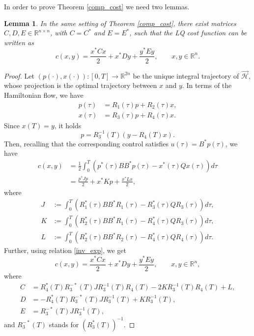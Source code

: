 \documentclass[reqno]{amsart}
\theoremstyle{plain}
\newtheorem{lem}[thm]{Lemma}
\theoremstyle{definition}
\theoremstyle{remark}
\newcommand{\R}{\mathbb{R}}
\begin{document}
In order to prove Theorem \ref{comp_cost} we need two lemmas.
	\begin{lem}\label{lem1}
		In the same setting of Theorem \ref{comp_cost}, there exist matrices $C,D,E\in\mathbb{R}^{n\times n}$, with $C=C^*$ and $E=E^*$, such that the LQ cost function can be written as
		\begin{equation}
			c(x,y)=\frac{x^*Cx}{2}+x^*Dy+\frac{y^*Ey}{2},\qquad x,y\in\mathbb{R}^n.
		\end{equation} 
	\end{lem}
	\begin{proof}
		Let $(p(\cdot),x(\cdot)):[0,T]\to \R^{2n}$ be the unique integral trajectory of $\overrightarrow{\mathcal{H}}$, whose projection is the optimal trajectory between $x$ and $y$. 
         In terms of the Hamiltonian flow, we have
        \begin{align}
        p(\tau) & = R_1(\tau) p + R_2(\tau) x,\\
        x(\tau) & = R_3(\tau) p + R_4(\tau)x.
        \end{align}
        Since $x(T)=y$, it holds
		\begin{equation}\label{inv_exp}
			p =R_3^{-1}(T)(y-R_4(T)x).
		\end{equation}
		Then, recalling that the corresponding control satisfies $u(\tau)=B^*p(\tau)$, we have 
		\begin{align}
			c(x,y) &=\frac{1}{2}\int_{0}^{T}\left(p^*(\tau)BB^*p(\tau)-x^*(\tau)Qx(\tau)\right)d\tau\\
			&=\frac{p^*Jp}{2}+x^*Kp+\frac{x^*Lx}{2},
		\end{align}
		where
		\begin{align}
			J&:=\int_{0}^{T}\left(R_1^*(\tau)BB^*R_1(\tau)-R_3^*(\tau)QR_3(\tau)\right)d\tau,\\
			K&:=\int_{0}^{T}\left(R_2^*(\tau)BB^*R_1(\tau)-R_4^*(\tau)QR_3(\tau)\right)d\tau,\\
			L&:=\int_{0}^{T}\left(R_2^*(\tau)BB^*R_2(\tau)-R_4^*(\tau)QR_4(\tau)\right)d\tau.
		\end{align}
		Further, using relation \eqref{inv_exp}, we get 
		\begin{equation}
			c(x,y)=\frac{x^*Cx}{2}+x^*Dy+\frac{y^*Ey}{2},\qquad x,y\in\mathbb{R}^n,
		\end{equation} 
		where 
		\begin{align}
			C&=R_4^*(T)R_3^{-*}(T)JR_3^{-1}(T)R_4(T)-2KR_3^{-1}(T)R_4(T)+L,\\
			D&=-R_4^*(T)R_3^{-*}(T)JR_3^{-1}(T)+KR_3^{-1}(T),\\
			E&=R_3^{-*}(T)JR_3^{-1}(T),
		\end{align}
		and $R^{-*}_3(T)$ stands for $(R_3^*(T))^{-1}$.
        

\end{proof}
\end{document}
